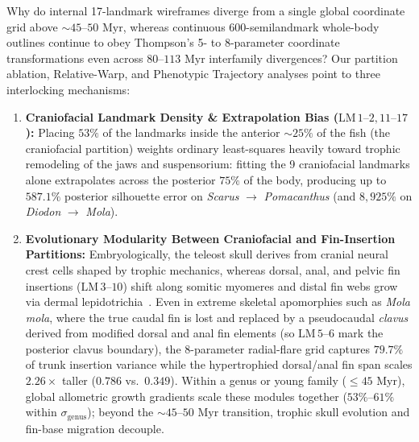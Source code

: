 \documentclass[11pt,a4paper]{article}
\theoremstyle{definition}
\theoremstyle{remark}
\begin{document}
Why do internal 17-landmark wireframes diverge from a single global coordinate grid above $\sim 45\text{--}50\text{ Myr}$, whereas continuous 600-semilandmark whole-body outlines continue to obey Thompson's 5- to 8-parameter coordinate transformations even across $80\text{--}113\text{ Myr}$ interfamily divergences? Our partition ablation, Relative-Warp, and Phenotypic Trajectory analyses point to three interlocking mechanisms:
\begin{enumerate}
  \item \textbf{Craniofacial Landmark Density \& Extrapolation Bias ($\mathrm{LM}\,1\text{--}2, 11\text{--}17$):} Placing $53\%$ of the landmarks inside the anterior $\sim 25\%$ of the fish (the craniofacial partition) weights ordinary least-squares heavily toward trophic remodeling of the jaws and suspensorium: fitting the 9 craniofacial landmarks alone extrapolates across the posterior $75\%$ of the body, producing up to $587.1\%$ posterior silhouette error on \emph{Scarus} $\to$ \emph{Pomacanthus} (and $8{,}925\%$ on \emph{Diodon} $\to$ \emph{Mola}).
  \item \textbf{Evolutionary Modularity Between Craniofacial and Fin-Insertion Partitions:} Embryologically, the teleost skull derives from cranial neural crest cells shaped by trophic mechanics, whereas dorsal, anal, and pelvic fin insertions ($\mathrm{LM}\,3\text{--}10$) shift along somitic myomeres and distal fin webs grow via dermal lepidotrichia~\cite{Satterfield2024,Larouche2018,Zelditch2012,Goswami2014,FeliceGoswami2018,Evans2021}. Even in extreme skeletal apomorphies such as \emph{Mola mola}, where the true caudal fin is lost and replaced by a pseudocaudal \emph{clavus} derived from modified dorsal and anal fin elements (so $\mathrm{LM}\,5\text{--}6$ mark the posterior clavus boundary), the 8-parameter radial-flare grid captures $79.7\%$ of trunk insertion variance while the hypertrophied dorsal/anal fin span scales $2.26\times$ taller ($0.786$ vs.\ $0.349$). Within a genus or young family ($\le 45\text{ Myr}$), global allometric growth gradients scale these modules together ($53\%\text{--}61\%$ within $\sigma_{\mathrm{genus}}$); beyond the $\sim 45\text{--}50\text{ Myr}$ transition, trophic skull evolution and fin-base migration decouple.

\end{enumerate}
\end{document}
